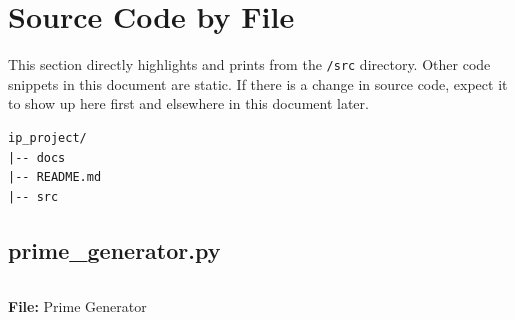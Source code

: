 \documentclass[titlepage]{article}
\newenvironment{longlisting}{\captionsetup{type=listing}}{}
\begin{document}



\cleardoublepage


\section{Source Code by File}
This section directly highlights and prints from the \texttt{/src} directory. Other code snippets in
this document are static. If there is a change in source code, expect it to show up here first and
elsewhere in this document later.
\begin{verbatim}
ip_project/
|-- docs
|-- README.md
|-- src
\end{verbatim}

\subsection{prime\_generator.py}
\begin{longlisting}
\inputminted{python}{../src/prime_generator.py}
\caption{\textbf{File:} Prime Generator}
\end{longlisting}
\end{document}
